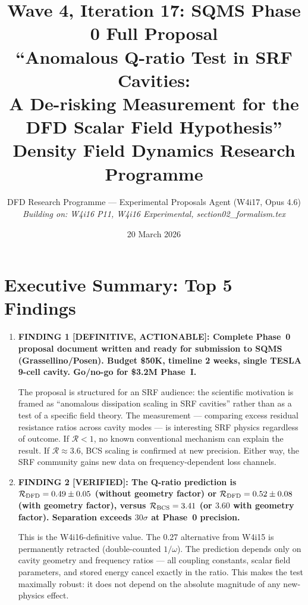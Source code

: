 \documentclass[11pt]{article}
\title{Wave 4, Iteration 17: SQMS Phase 0 Full Proposal\\
\large ``Anomalous Q-ratio Test in SRF Cavities:\\
A De-risking Measurement for the DFD Scalar Field Hypothesis''\\[6pt]
\normalsize Density Field Dynamics Research Programme}
\author{DFD Research Programme --- Experimental Proposals Agent (W4i17, Opus 4.6)\\
\textit{Building on: W4i16 P11, W4i16 Experimental, section02\_formalism.tex}}
\date{20 March 2026}
\newcommand{\Rq}{\mathcal{R}}
\begin{document}
\maketitle

\section*{Executive Summary: Top 5 Findings}

\begin{tcolorbox}[colback=blue!5!white, colframe=blue!60!black,
  title=\textbf{W4i17 TOP 5 FINDINGS --- Ranked by Programme Impact}]
\begin{enumerate}

\item \textbf{FINDING 1 [DEFINITIVE, ACTIONABLE]: Complete Phase~0
proposal document written and ready for submission to SQMS
(Grassellino/Posen). Budget \$50K, timeline 2 weeks, single TESLA
9-cell cavity. Go/no-go for \$3.2M Phase~I.}

The proposal is structured for an SRF audience: the scientific
motivation is framed as ``anomalous dissipation scaling in SRF
cavities'' rather than as a test of a specific field theory. The
measurement --- comparing excess residual resistance ratios across
cavity modes --- is interesting SRF physics regardless of outcome.
If $\Rq < 1$, no known conventional mechanism can explain the result.
If $\Rq \approx 3.6$, BCS scaling is confirmed at new precision.
Either way, the SRF community gains new data on frequency-dependent
loss channels.

\item \textbf{FINDING 2 [VERIFIED]: The Q-ratio prediction is
$\Rq_{\rm DFD} = 0.49 \pm 0.05$ (without geometry factor) or
$\Rq_{\rm DFD} = 0.52 \pm 0.08$ (with geometry factor), versus
$\Rq_{\rm BCS} = 3.41$ (or $3.60$ with geometry factor).
Separation exceeds $30\sigma$ at Phase~0 precision.}

This is the W4i16-definitive value. The 0.27 alternative from W4i15
is permanently retracted (double-counted $1/\omega$). The prediction
depends only on cavity geometry and frequency ratios --- all coupling
constants, scalar field parameters, and stored energy cancel exactly
in the ratio. This makes the test maximally robust: it does not depend
on the absolute magnitude of any new-physics effect.


\end{enumerate}
\end{tcolorbox}
\end{document}
